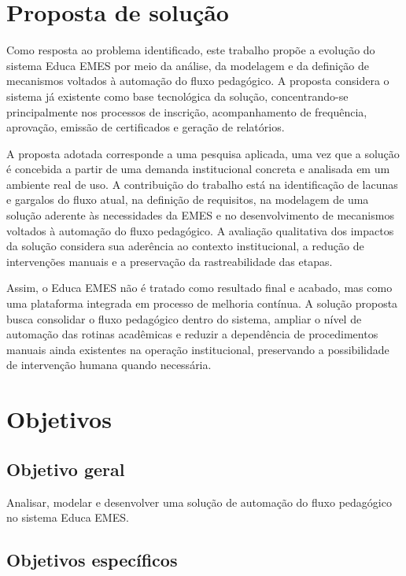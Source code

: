 \section{Proposta de solução}
\label{sec:intro:prop_sol}

Como resposta ao problema identificado, este trabalho propõe a evolução do
sistema Educa EMES por meio da análise, da modelagem e da definição de
mecanismos voltados à automação do fluxo pedagógico. A proposta considera o
sistema já existente como base tecnológica da solução, concentrando-se
principalmente nos processos de inscrição, acompanhamento de frequência,
aprovação, emissão de certificados e geração de relatórios.

A proposta adotada corresponde a uma pesquisa aplicada, uma vez que a solução é
concebida a partir de uma demanda institucional concreta e analisada em um
ambiente real de uso. A contribuição do trabalho está na identificação de
lacunas e gargalos do fluxo atual, na definição de requisitos, na modelagem de
uma solução aderente às necessidades da EMES e no desenvolvimento de mecanismos
voltados à automação do fluxo pedagógico. A avaliação qualitativa dos impactos
da solução considera sua aderência ao contexto institucional, a redução de
intervenções manuais e a preservação da rastreabilidade das etapas.

Assim, o Educa EMES não é tratado como resultado final e acabado, mas como uma
plataforma integrada em processo de melhoria contínua. A solução proposta busca
consolidar o fluxo pedagógico dentro do sistema, ampliar o nível de automação
das rotinas acadêmicas e reduzir a dependência de procedimentos manuais ainda
existentes na operação institucional, preservando a possibilidade de
intervenção humana quando necessária.

\section{Objetivos}
\label{sec:intro:obj}

\subsection{Objetivo geral}
\label{sec:intro:obj:ger}

Analisar, modelar e desenvolver uma solução de automação do fluxo pedagógico no
sistema Educa EMES.

\subsection{Objetivos específicos}
\label{sec:intro:obj:esp}

